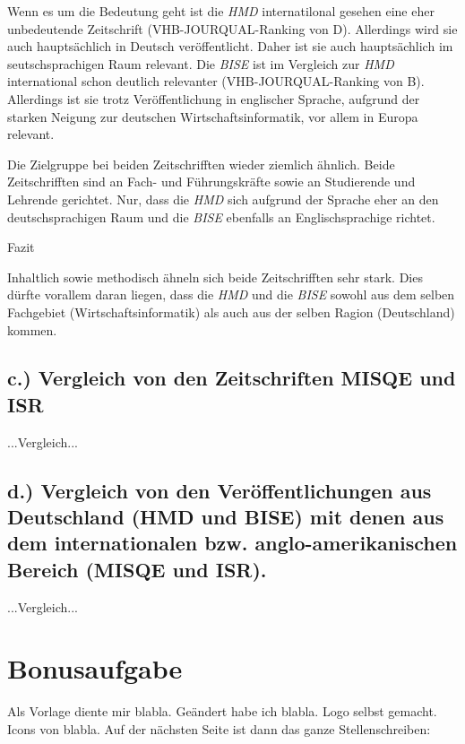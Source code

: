 \documentclass[12pt,utf8]{scrartcl}
\begin{document}
\begin{flushleft}
Wenn es um die Bedeutung geht ist die \emph{HMD} internatilonal gesehen eine eher unbedeutende Zeitschrift (VHB-JOURQUAL-Ranking von D)\cite{VHB}. Allerdings wird sie auch hauptsächlich in Deutsch veröffentlicht. Daher ist sie auch hauptsächlich im seutschsprachigen Raum relevant. 
Die \emph{BISE} ist im Vergleich zur \emph{HMD} international schon deutlich relevanter (VHB-JOURQUAL-Ranking von B)\cite{VHB}. Allerdings ist sie trotz Veröffentlichung in englischer Sprache, aufgrund der starken Neigung zur deutschen Wirtschaftsinformatik, vor allem in Europa relevant. 

Die Zielgruppe bei beiden Zeitschrifften wieder ziemlich ähnlich. Beide Zeitschrifften sind an Fach- und Führungskräfte sowie an Studierende und Lehrende gerichtet. Nur, dass die \emph{HMD} sich aufgrund der Sprache eher an den deutschsprachigen Raum und die \emph{BISE} ebenfalls an Englischsprachige richtet.
\newline

{\Large Fazit}

Inhaltlich sowie methodisch ähneln sich beide Zeitschrifften sehr stark. Dies dürfte vorallem daran liegen, dass die \emph{HMD} und die \emph{BISE} sowohl aus dem selben Fachgebiet (Wirtschaftsinformatik) als auch aus der selben Ragion (Deutschland) kommen.
\subsection{\label{sub3:einfuehrung}c.) Vergleich von den Zeitschriften MISQE und ISR}

...Vergleich...

\subsection{\label{sub4:einfuehrung}d.) Vergleich von den Veröffentlichungen aus Deutschland (HMD und BISE) mit denen aus dem internationalen bzw. anglo-amerikanischen Bereich (MISQE und ISR).}

...Vergleich...

\section{\label{sec:bonus}Bonusaufgabe}

Als Vorlage diente mir \cite{online1}  blabla. Geändert habe ich blabla. Logo selbst gemacht.
Icons von blabla\cite{online2}. Auf der nächsten Seite ist dann das ganze Stellenschreiben:


\end{flushleft}
\end{document}
